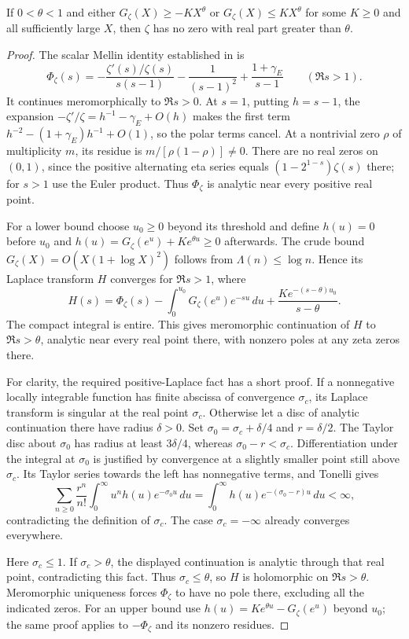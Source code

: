 \begin{lemma}
If $0<\theta<1$ and either $G_\zeta(X)\ge-KX^\theta$ or $G_\zeta(X)\le KX^\theta$ for some $K\ge0$ and all sufficiently large $X$, then $\zeta$ has no zero with real part greater than $\theta$.
\end{lemma}
\begin{proof}
The scalar Mellin identity established in  is
\[
 \Phi_\zeta(s)=-\frac{\zeta'(s)/\zeta(s)}{s(s-1)}
 -\frac1{(s-1)^2}+\frac{1+\gamma_E}{s-1}\qquad(\Re s>1).
\]
It continues meromorphically to $\Re s>0$. At $s=1$, putting $h=s-1$, the expansion
$-\zeta'/\zeta=h^{-1}-\gamma_E+O(h)$ makes the first term
$h^{-2}-(1+\gamma_E)h^{-1}+O(1)$, so the polar terms cancel. At a nontrivial zero $\rho$ of multiplicity $m$, its residue is $m/[\rho(1-\rho)]\ne0$. There are no real zeros on $(0,1)$, since the positive alternating eta series equals $(1-2^{1-s})\zeta(s)$ there; for $s>1$ use the Euler product. Thus $\Phi_\zeta$ is analytic near every positive real point.

For a lower bound choose $u_0\ge0$ beyond its threshold and define $h(u)=0$ before $u_0$ and $h(u)=G_\zeta(e^u)+Ke^{\theta u}\ge0$ afterwards. The crude bound $G_\zeta(X)=O(X(1+\log X)^2)$ follows from $\Lambda(n)\le\log n$. Hence its Laplace transform $H$ converges for $\Re s>1$, where
\[
 H(s)=\Phi_\zeta(s)-\int_0^{u_0}G_\zeta(e^u)e^{-su}\,du
       +\frac{Ke^{-(s-\theta)u_0}}{s-\theta}.
\]
The compact integral is entire. This gives meromorphic continuation of $H$ to $\Re s>\theta$, analytic near every real point there, with nonzero poles at any zeta zeros there.

For clarity, the required positive-Laplace fact has a short proof. If a nonnegative locally integrable function has finite abscissa of convergence $\sigma_c$, its Laplace transform is singular at the real point $\sigma_c$. Otherwise let a disc of analytic continuation there have radius $\delta>0$. Set $\sigma_0=\sigma_c+\delta/4$ and $r=\delta/2$. The Taylor disc about $\sigma_0$ has radius at least $3\delta/4$, whereas $\sigma_0-r<\sigma_c$. Differentiation under the integral at $\sigma_0$ is justified by convergence at a slightly smaller point still above $\sigma_c$. Its Taylor series towards the left has nonnegative terms, and Tonelli gives
\[
 \sum_{n\ge0}\frac{r^n}{n!}
  \int_0^\infty u^nh(u)e^{-\sigma_0u}\,du
 =\int_0^\infty h(u)e^{-(\sigma_0-r)u}\,du<\infty,
\]
contradicting the definition of $\sigma_c$. The case $\sigma_c=-\infty$ already converges everywhere.

Here $\sigma_c\le1$. If $\sigma_c>\theta$, the displayed continuation is analytic through that real point, contradicting this fact. Thus $\sigma_c\le\theta$, so $H$ is holomorphic on $\Re s>\theta$. Meromorphic uniqueness forces $\Phi_\zeta$ to have no pole there, excluding all the indicated zeros. For an upper bound use $h(u)=Ke^{\theta u}-G_\zeta(e^u)$ beyond $u_0$; the same proof applies to $-\Phi_\zeta$ and its nonzero residues.
\end{proof}


